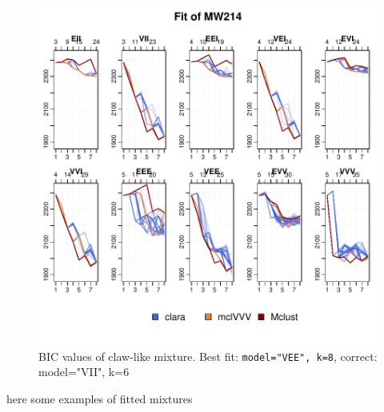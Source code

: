 \begin{figure}[h!]
    \begin{Rgraph}[0.9]
\includegraphics{chapter3-figMW214bic}
    \caption{BIC values of claw-like mixture. Best fit: {\tt model="VEE", k=8},
             correct: {model="VII", k=6}}
    \label{}
    \end{Rgraph}
\end{figure}

here some examples of fitted mixtures

